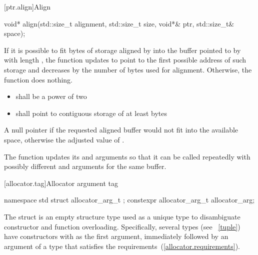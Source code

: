 [ptr.align]{Align}

%
\begin{itemdecl}
void* align(std::size_t alignment, std::size_t size,
    void*& ptr, std::size_t& space);
\end{itemdecl}

\begin{itemdescr}
\pnum
\effects If it is possible to fit  bytes
of storage aligned by  into the buffer pointed to by
 with length , the function updates
 to point to the first possible address of such storage
and decreases  by the number of bytes used for alignment.
Otherwise, the function does nothing.

\pnum
\requires

\begin{itemize}
\item {} shall be a power of two

\item {} shall point to contiguous storage of at least
 bytes
\end{itemize}

\pnum
\returns A null pointer if the requested aligned buffer
would not fit into the available space, otherwise the adjusted value
of .

\pnum
\enternote The function updates its 
and  arguments so that it can be called repeatedly
with possibly different  and 
arguments for the same buffer.  \exitnote
\end{itemdescr}

[allocator.tag]{Allocator argument tag}

\begin{itemdecl}
namespace std {
  struct allocator_arg_t { };
  constexpr allocator_arg_t allocator_arg{};
}
\end{itemdecl}

\pnum
The  struct is an empty structure type used as a unique type to
disambiguate constructor and function overloading. Specifically, several types (see
~\ref{tuple}) have constructors with  as the first
argument, immediately followed by an argument of a type that satisfies the
 requirements~(\ref{allocator.requirements}).

